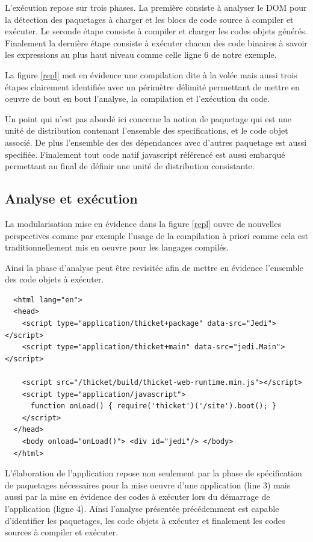 \documentclass[twoside,a4paper]{article}
\begin{document}
L'exécution repose sur  trois phases. La première  consiste à analyser
le DOM pour la détection des paquetages à charger et les blocs de code
source à compiler et exécuter. Le seconde étape consiste à compiler et
charger  les  codes  objets  générés.  Finalement  la  dernière  étape
consiste à exécuter chacun des  code binaires à savoir les expressions
au  plus haut  niveau comme  celle ligne  6 de  notre exemple.  

La figure \ref{repl}  met en évidence une compilation dite  à la volée
mais  aussi  trois  étapes  clairement identifiée  avec  un  périmètre
délimité permettant de mettre en oeuvre  de bout en bout l'analyse, la
compilation  et l'exécution  du  code. 

Un point qui n'est pas abordé  ici concerne la notion de paquetage qui
est une unité de distribution contenant l'ensemble des specifications,
et le code objet associé. De  plus l'ensemble des des dépendances avec
d'autres paquetage  est aussi  specifiée.  Finalement tout  code natif
javascript référencé est aussi embarqué permettant au final de définir
une unité de distribution consistante.

\subsection{Analyse et exécution}

La modularisation mise en évidence  dans la figure \ref{repl} ouvre de
nouvelles perspectives comme  par exemple l'usage de  la compilation à
priori  comme  cela est  traditionnellement  mis  en oeuvre  pour  les
langages compilés.

Ainsi  la  phase d'analyse  peut  être  revisitée  afin de  mettre  en
évidence l'ensemble des code objets à exécuter.

\lstset{language=Html}
\begin{lstlisting}
  <html lang="en">
  <head>
    <script type="application/thicket+package" data-src="Jedi"></script>
    <script type="application/thicket+main" data-src="jedi.Main"></script>

    <script src="/thicket/build/thicket-web-runtime.min.js"></script>    
    <script type="application/javascript">
      function onLoad() { require('thicket')('/site').boot(); }
    </script>
  </head>        
    <body onload="onLoad()"> <div id="jedi"/> </body>
  </html>
\end{lstlisting}

L'élaboration de  l'application repose non  seulement par la  phase de
spécification  de paquetages  nécessaires  pour la  mise oeuvre  d'une
application (line  3) mais aussi par  la mise en évidence  des codes à
exécuter lors du démarrage de l'application (ligne 4). Ainsi l'analyse
présentée précédemment  est capable  d'identifier les  paquetages, les
code objets à  exécuter et finalement les codes sources  à compiler et
exécuter.
\end{document}
